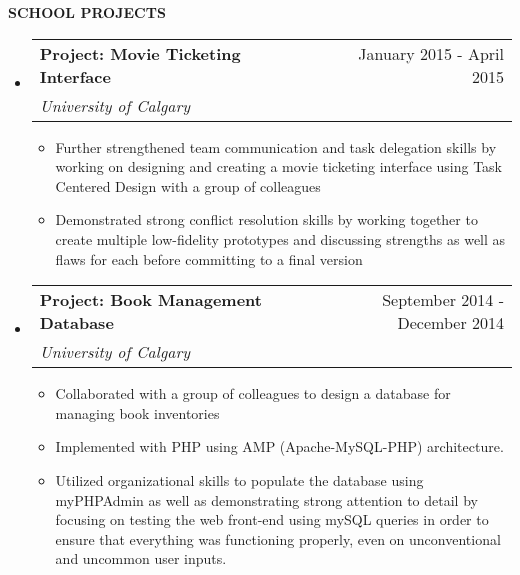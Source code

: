 \documentclass[letterpaper,11pt]{article}
\makeatletter
\newcommand{\resitem}[1]{\item #1 \vspace{-2pt}}
\newcommand{\resheading}[1]{{\large \colorbox{mygrey}{\begin{minipage}{\textwidth}{\textbf{#1 \vphantom{p\^{E}}}}\end{minipage}}}}
\newcommand{\ressubheading}[4]{
\begin{tabular*}{7.0in}{l@{\extracolsep{\fill}}r}
		\textbf{#1} & #2 \\
		\textit{#3} & \textit{#4} \\
\end{tabular*}\vspace{-6pt}}
\makeatother
\begin{document}
\resheading{SCHOOL PROJECTS}
\begin{itemize}
\item
	\ressubheading{Project: Movie Ticketing Interface}{January 2015 - April 2015}{University of Calgary}{}
	\begin{itemize}
		\resitem{Further strengthened team communication and task delegation skills by working on designing and creating a movie ticketing interface using Task Centered Design with a group of colleagues}
		\resitem{Demonstrated strong conflict resolution skills by working together to create multiple low-fidelity prototypes and discussing strengths as well as flaws for each before committing to a final version}
	\end{itemize}

\item
	\ressubheading{Project: Book Management Database}{September 2014 - December 2014}{University of Calgary}{}
	\begin{itemize}
		\resitem{Collaborated with a group of colleagues to design a database for managing book inventories}
		\resitem{Implemented with PHP using AMP (Apache-MySQL-PHP) architecture.}
		\resitem{Utilized organizational skills to populate the database using myPHPAdmin as well as demonstrating strong attention to detail by focusing on testing the web front-end using mySQL queries in order to ensure that everything was functioning properly, even on unconventional and uncommon user inputs.}
	\end{itemize}

\end{itemize}
\end{document}
